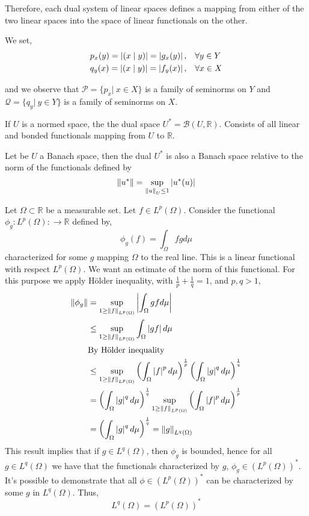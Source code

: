 Therefore, each dual system of linear spaces defines a mapping from either of the two linear spaces into the space of linear functionals on the other.

We set,
\begin{align*}
p_x(y)=\left|(x\mid y)\right|=\left|g_x(y)\right|, & \quad \forall y \in Y \\	
q_y(x)=\left|(x\mid y)\right|=\left|f_y(x)\right|, & \quad \forall x \in X
\end{align*}

and we observe that $\mathcal{P} = \{p_x | \ x \in X \}$ is a family of seminorms on $Y$ and $\mathcal{Q}=\{q_y | \ y \in  Y\} $ is a family of seminorms on $X$. 


\begin{definition}
	If $U$ is a normed space, the the dual space $U^*=\mathcal{B}(U, \mathbb{R})$. Consists of all linear and bonded functionals mapping from $U$ to $\mathbb{R}$.
\end{definition}
\begin{theorem}
	Let be $U$ a Banach space, then the dual $U^*$ is also a Banach space relative to the norm of the functionals defined by \[\left\lVert u^*\right\rVert=\sup_{\left\lVert u\right\rVert_U\leq 1} \left|u^*(u)\right|\]
\end{theorem}
\begin{example}
	Let $\Omega \subset \mathbb{R}$ be a measurable set. Let $f \in L^p(\Omega)$. Consider the functional $\phi_g: L^p(\Omega):\rightarrow \mathbb{R}$ defined by,
	\[
		\phi_g (f) = \int_{\Omega} f g d\mu 
	\]
	characterized for some $g$ mapping $\Omega$ to the real line. This is a linear functional with respect $L^p(\Omega)$. We want an estimate of the norm of this functional. For this purpose we apply H\"older inequality, with $\frac{1}{p}+\frac{1}{q}=1$, and $p,q >1$,
	\begin{align*}
		\norm{\phi_g}&=\sup_{1\geq \norm{f}_{L^p(\Omega)}}\abs{\int_{\Omega} gf d\mu}\\
		&\leq 	\sup_{1\geq\norm{f}_{L^p(\Omega)}}\int_{\Omega} \abs{gf} d\mu\\
		&{\centering \text{By H\"older inequality}}\\
		&\leq	\sup_{1\geq\norm{f}_{L^p(\Omega)}}\left(\int_{\Omega} \abs{f}^p d\mu \right)^{\frac{1}{p}}\left(\int_{\Omega} \abs{g}^q d\mu \right)^{\frac{1}{q}}\\
		&=\left(\int_{\Omega} \abs{g}^q d\mu \right)^{\frac{1}{q}} \sup_{1\geq\norm{f}_{L^p(\Omega)}}\left(\int_{\Omega} \abs{f}^p d\mu \right)^{\frac{1}{p}} \\
		&=\left(\int_{\Omega} \abs{g}^q d\mu \right)^{\frac{1}{q}}=\norm{g}_{L^q(\Omega)}
	\end{align*}
	This result implies that if $g \in L^q(\Omega)$, then $\phi_g$ is bounded, hence for all $g\in L^q(\Omega)$ we have that the functionals characterized by $g$,  $\phi_g \in (L^p(\Omega))^*$. It's possible to demonstrate that all $ \phi \in (L^p(\Omega))^*$ can be characterized by some $g$ in $L^q(\Omega)$. Thus, \[L^q(\Omega)=(L^p(\Omega))^*\]
\end{example}

